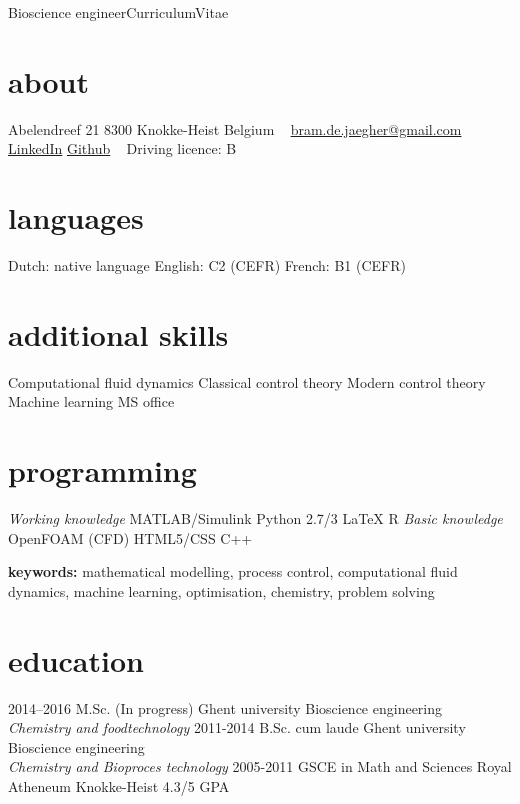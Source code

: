 \documentclass[]{friggeri-cv}
\begin{document}
       {Bioscience engineer}{Curriculum}{Vitae}
\begin{aside}
  \section{about}
    Abelendreef 21
    8300 Knokke-Heist
    Belgium
    ~
    \href{mailto:bram.de.jaegher@gmail.com}{bram.de.jaegher@gmail.com}
    \href{http://be.linkedin.com/in/BramDeJaegher}{LinkedIn}
    \href{https://github.com/Beramos}{Github}
    ~
    Driving licence: B \vspace{-0.8mm}
  \section{languages}
    Dutch: native language
    English: C2 (CEFR)
    French:  B1  (CEFR) \vspace{3.3mm}
  \section{additional skills}
  Computational fluid dynamics
  Classical control theory 
  Modern control theory 
  Machine learning
  MS office \vspace{8mm}
  \section{programming} 
  \textit{Working knowledge}
  MATLAB/Simulink
  Python 2.7/3
  LaTeX
  R \vspace{0.1cm}
  \textit{Basic knowledge}
  OpenFOAM (CFD)
  HTML5/CSS
  C++
\end{aside}
\vspace{3mm}
\textbf{keywords:} mathematical modelling, process control, computational fluid dynamics, machine learning, optimisation, chemistry, problem solving
\vspace{3mm}
\section{education}
\begin{entrylist}
    \entry
    {2014–2016}
    {M.Sc. (In progress)}
    {Ghent university}
    {Bioscience engineering\\
    \emph{Chemistry and foodtechnology}}
  \entry
    {2011-2014}
    {B.Sc. cum laude}
    {Ghent university}
    {Bioscience engineering\\
    \emph{Chemistry and Bioproces technology}}
  \entry
    {2005-2011}
    {GSCE in Math and Sciences}
    {Royal Atheneum Knokke-Heist}
    {4.3/5 GPA}
   
\end{entrylist}
\end{document}
